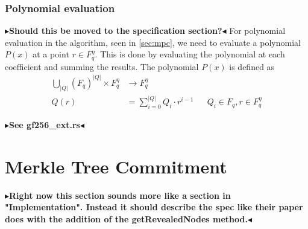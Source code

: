 \documentclass[twoside,11pt]{report}
\theoremstyle{definition}
\theoremstyle{plain}
\newcommand{\todo}[1]{{\color[rgb]{.5,0,0}\textbf{$\blacktriangleright$#1$\blacktriangleleft$}}}
\begin{document}
\subsubsection{Polynomial evaluation}
\todo{Should this be moved to the specification section?}
For polynomial evaluation in the algorithm, seen in \autoref{sec:mpc}, we need to evaluate a polynomial $P(x)$ at a point $r \in F_q^\eta$. This is done by evaluating the polynomial at each coefficient and summing the results. The polynomial $P(x)$ is defined as
\begin{align}
  \textstyle\bigcup_{|Q|}(F_q)^{|Q|} \times F_q^\eta & \rightarrow F_q^\eta                 \nonumber                                                    \\
  Q(r)                                               & = \textstyle\sum_{i=0}^{|Q|} Q_i \cdot r^{i-1} &  & Q_i \in F_q, r \in F_q^\eta\label{eq:mpcpoly}
\end{align}

\todo{See gf256\_ext.rs}

\section{Merkle Tree Commitment}

\todo{Right now this section sounds more like a section in "Implementation". Instead it should describe the spec like their paper does with the addition of the getRevealedNodes method.}
\end{document}
